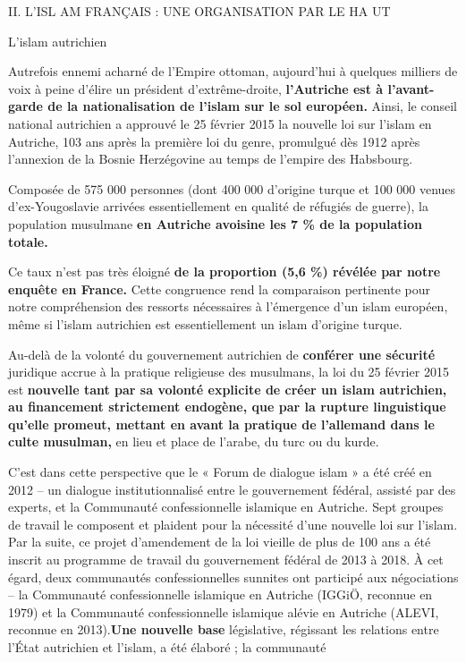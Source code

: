 II. L'ISL AM FRANÇAIS : UNE ORGANISATION PAR LE HA UT


L'islam autrichien


Autrefois ennemi acharné de l'Empire ottoman, aujourd'hui à quelques
milliers de voix à peine d'élire un président d'extrême-droite,
\textbf{l'Autriche est à l'avant-garde de la nationalisation de l'islam
sur le sol européen.} Ainsi, le conseil national autrichien a approuvé
le 25 février 2015 la nouvelle loi sur l'islam en Autriche, 103 ans
après la première loi du genre, promulgué dès 1912 après l'annexion de
la Bosnie Herzégovine au temps de l'empire des Habsbourg.

Composée de 575 000 personnes (dont 400 000 d'origine turque et 100 000
venues d'ex-Yougoslavie arrivées essentiellement en qualité de réfugiés
de guerre), la population musulmane \textbf{en Autriche avoisine les 7
\% de la population totale.}

Ce taux n'est pas très éloigné \textbf{de la proportion (5,6 \%) révélée
par notre enquête en France.} Cette congruence rend la comparaison
pertinente pour notre compréhension des ressorts nécessaires à
l'émergence d'un islam européen, même si l'islam autrichien est
essentiellement un islam d'origine turque.

Au-delà de la volonté du gouvernement autrichien de \textbf{conférer une
sécurité} juridique accrue à la pratique religieuse des musulmans, la
loi du 25 février 2015 est \textbf{nouvelle tant par sa volonté
explicite de créer un islam autrichien, au financement strictement
endogène, que par la rupture linguistique qu'elle promeut, mettant en
avant la pratique de l'allemand dans le culte musulman,} en lieu et
place de l'arabe, du turc ou du kurde.

C'est dans cette perspective que le « Forum de dialogue islam » a été
créé en 2012 -- un dialogue institutionnalisé entre le gouvernement
fédéral, assisté par des experts, et la Communauté confessionnelle
islamique en Autriche. Sept groupes de travail le composent et plaident
pour la nécessité d'une nouvelle loi sur l'islam. Par la suite, ce
projet d'amendement de la loi vieille de plus de 100 ans a été inscrit
au programme de travail du gouvernement fédéral de 2013 à 2018. À cet
égard, deux communautés confessionnelles sunnites ont participé aux
négociations -- la Communauté confessionnelle islamique en Autriche
(IGGiÖ, reconnue en 1979) et la Communauté confessionnelle islamique
alévie en Autriche (ALEVI, reconnue en 2013).\textbf{Une nouvelle base}
législative, régissant les relations entre l'État autrichien et l'islam,
a été élaboré ; la communauté



